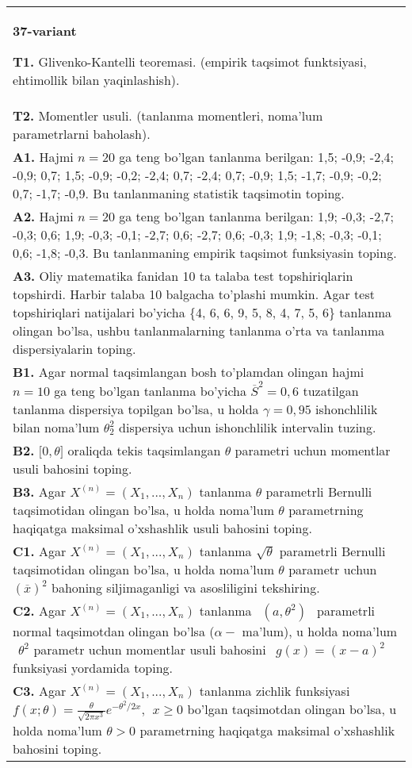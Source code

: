 \documentclass{article}
\begin{document}
\begin{tabular}{m{17cm}}
\textbf{37-variant}
\newline

\textbf{T1.} 
Glivenko-Kantelli teoremasi. (empirik taqsimot funktsiyasi, ehtimollik bilan yaqinlashish).
\\
\textbf{T2.} 
Momentler usuli. (tanlanma momentleri, noma'lum parametrlarni baholash).
\\
\textbf{A1.} 
Hajmi \(n = 20\) ga teng bo'lgan tanlanma berilgan: 1,5; -0,9; -2,4; -0,9; 0,7; 1,5; -0,9; -0,2; -2,4; 0,7; -2,4; 0,7; -0,9; 1,5; -1,7; -0,9; -0,2; 0,7; -1,7; -0,9. Bu tanlanmaning statistik taqsimotin toping.
\\
\textbf{A2.} 
Hajmi \(n = 20\) ga teng bo'lgan tanlanma berilgan: 1,9; -0,3; -2,7; -0,3; 0,6; 1,9; -0,3; -0,1; -2,7; 0,6; -2,7; 0,6; -0,3; 1,9; -1,8; -0,3; -0,1; 0,6; -1,8; -0,3. Bu tanlanmaning empirik taqsimot funksiyasin toping.
\\
\textbf{A3.} 
Oliy matematika fanidan 10 ta talaba test topshiriqlarin topshirdi. Harbir talaba 10 balgacha to'plashi mumkin. Agar test topshiriqlari natijalari bo'yicha \{4, 6, 6, 9, 5, 8, 4, 7, 5, 6\} tanlanma olingan bo'lsa, ushbu tanlanmalarning tanlanma o'rta va tanlanma dispersiyalarin toping.
\\
\textbf{B1.} 
Agar normal taqsimlangan bosh to'plamdan olingan hajmi \(n = 10\) ga teng bo'lgan tanlanma bo'yicha \({\overline{S}}^{2} = 0,6\) tuzatilgan tanlanma dispersiya topilgan bo'lsa, u holda \(\gamma = 0,95\) ishonchlilik bilan noma'lum \(\theta_{2}^{2}\) dispersiya uchun ishonchlilik intervalin tuzing.
\\
\textbf{B2.} 
\(\lbrack 0,\theta\rbrack\) oraliqda tekis taqsimlangan \(\theta\) parametri uchun momentlar usuli bahosini toping.
\\
\textbf{B3.} 
Agar \(X^{(n)} = \left( X_{1},...,X_{n} \right)\) tanlanma \(\theta\) parametrli Bernulli taqsimotidan olingan bo'lsa, u holda noma'lum \(\theta\) parametrning haqiqatga maksimal o'xshashlik usuli bahosini toping.
\\
\textbf{C1.} 
Agar \(X^{(n)} = \left( X_{1},...,X_{n} \right)\) tanlanma \(\sqrt{\theta}\) parametrli Bernulli taqsimotidan olingan bo'lsa, u holda noma'lum \(\theta\) parametr uchun \((\overline{x})^{2}\) bahoning siljimaganligi va asosliligini tekshiring.
\\
\textbf{C2.} 
Agar \(X^{(n)} = \left( X_{1},...,X_{n} \right)\) tanlanma \(\ \ (a,\theta^{2})\ \ \) parametrli normal taqsimotdan olingan bo'lsa (\(\alpha -\) ma'lum), u holda noma'lum \(\ \ \theta^{2}\) parametr uchun momentlar usuli bahosini \(\ \ g(x) = (x - a)^{2}\) funksiyasi yordamida toping.
\\
\textbf{C3.} 
Agar \(X^{(n)} = \left( X_{1},...,X_{n} \right)\) tanlanma zichlik funksiyasi \(f(x;\theta) = \frac{\theta}{\sqrt{2\pi x^{3}}}e^{- \theta^{2}/2x},\ \ x \geq 0\) bo'lgan taqsimotdan olingan bo'lsa, u holda noma'lum \(\theta > 0\) parametrning haqiqatga maksimal o'xshashlik bahosini toping.
\\

\end{tabular}
\vspace{1cm}
\end{document}
